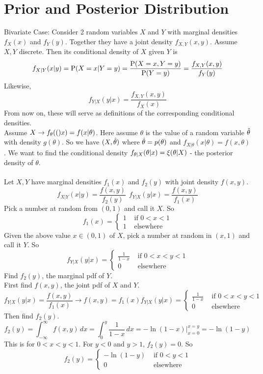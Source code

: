 \documentclass[12pt]{article}
\begin{document}
\section{Prior and Posterior Distribution} 
Bivariate Case: Consider 2 random variables $X$ and $Y$ with marginal densities $f_X(x)$ and $f_Y(y)$. Together they have a joint density $f_{X,Y}(x,y)$. Assume $X,Y$ discrete. Then its conditional density of $X$ given $Y$ is $$ f_{X|Y}(x|y) = \mathrm{P}( X = x | Y = y ) = \frac{\mathrm{P}( X=x,Y=y )}{\mathrm{P}( Y=y )} = \frac{f_{X,Y}(x,y)}{f_Y(y)} $$ 
Likewise, $$f_{Y|X}(y|x) = \frac{f_{X,Y}(x,y)}{f_X(x)} $$ 
From now on, these will serve as definitions of the corresponding conditional densities. \\
Assume $X \to f_{\theta}( ( )x) = f(x|\theta)$. Here assume $\theta$ is the value of a random variable $\hat{\theta}$ with density $g(\theta)$. So we have $(X,\hat{\theta})$ where $\hat{\theta} = p(\theta)$ and $f_{X|\theta}(x|\theta) = f(x,\theta)$. We want to find the conditional density $f_{\theta|X}(\theta|x) = \xi( \theta|X )$ - the posterior density of $\theta$. \\~\\
Let $X,Y$ have marginal densities $f_1(x)$ and $f_2(y)$ with joint density $f(x,y)$. 
$$ f_{X|Y}(x|y) = \frac{f(x,y)}{f_2(y)} ~~ f_{Y|X}(y|x) = \frac{f(x,y)}{f_1(x)} $$ 
Pick a number at random from $(0,1)$ and call it $X$. So $$f_1(x) = \begin{cases} 1 &\text{ if } 0 < x < 1 \\ 1 &\text{ elsewhere } \end{cases} $$ Given the above value $x \in (0,1)$ of $X$, pick a number at random in $(x,1)$ and call it $Y$. So $$ f_{Y|X}(y|x) = \begin{cases} \frac{1}{1-x} &\text{ if } 0 < x < y < 1 \\ 0 &\text{ elsewhere} \end{cases} $$ 
Find $f_2(y)$, the marginal pdf of $Y$. \\
First find $f(x,y)$, the joint pdf of $X$ and $Y$. 
$$f_{Y|X}(y|x) = \frac{f(x,y)}{f_1(x)} \to f(x,y) = f_1(x)f_{Y|X}(y|x) = \begin{cases} \frac{1}{1-x} &\text{ if } 0 < x < y < 1 \\ 0 &\text{ elsewhere} \end{cases} $$ 
Then find $f_2(y)$. 
$$f_2(y) = \int_{-\infty}^\infty f(x,y)\,dx = \int_0^y \frac{1}{1-x} \, dx = -\ln(1-x)\Big|_{x= 0}^{x = y} = -\ln(1-y) $$
This is for $0 < x < y < 1$. For $y < 0$ and $y > 1$, $f_2(y) = 0$. So 
$$ f_2(y) = \begin{cases} -\ln(1-y) &\text{ if }  0 < y < 1 \\ 0 &\text{ elsewhere } \end{cases} $$ 
\end{document}
